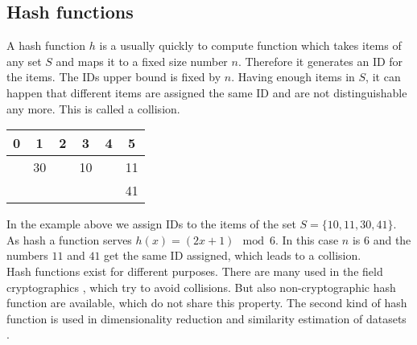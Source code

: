 \subsection{Hash functions}
A hash function $ h $ is a usually quickly to compute function which takes  items of any set $ S $ and maps it to a fixed size number $ n $. Therefore it generates an ID for the items. The IDs upper bound is fixed by $ n $. Having enough items in $ S $, it can happen that different items are assigned the same ID and are not distinguishable any more. This is called a collision.\\

\begin{table}[h!]
    \centering
    \begin{tabular}{| c | c | c | c | c | c |}
        \hline
        0  & 1  & 2  & 3  & 4  & 5  \\
        \hline
           & 30 &    & 10 &    & 11 \\
        \hline
           &    &    &    &    & 41 \\
        \hline
    \end{tabular}   
\end{table}
    
In the example above we assign IDs to the items of the set $ S = \{ 10,11,30,41 \} $. As hash a function serves $ h(x) = (2x+1) \mod 6 $.  In this case $ n $ is $ 6 $ and the numbers $ 11 $ and $ 41 $ get the same ID assigned, which leads to a collision.\\

Hash functions exist for different purposes. There are many used in the field cryptographics \cite{cryptographicHashFunctions}, which try to avoid collisions. But also non-cryptographic hash function are available, which do not share this property. The second kind of hash function is used in dimensionality reduction and similarity estimation of datasets \cite{practicalHashFunctions}.